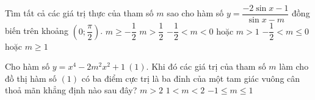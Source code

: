 \begin{ex}%
Tìm tất cả các giá trị thực của tham số $m$ sao cho hàm số $y=\dfrac{-2\sin x-1}{\sin x-m}$ đồng biến trên khoảng $\left(0;\dfrac{\pi}{2}\right)$.
\choice
{$m\ge -\dfrac{1}{2}$}
{$m>\dfrac{1}{2}$}
{$-\dfrac{1}{2}<m<0$ hoặc $m>1$}
{\True $-\dfrac{1}{2}<m\le 0$ hoặc $m\ge 1$}
\end{ex}

\begin{ex}%
Cho hàm số $y=x^4-2m^2x^2+1\ (1)$. Khi đó các giá trị của tham số $m$ làm cho đồ thị hàm số $(1)$ có ba điểm cực trị là ba đỉnh của một tam giác vuông cân thoả mãn khẳng định nào sau đây?
{$m>2$}
{$1<m<2$}
{\True $-1\le m\le 1$}
\end{ex}

